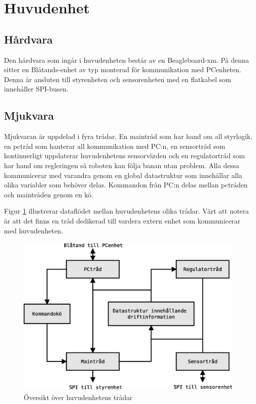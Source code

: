
\section{Huvudenhet}


\subsection{Hårdvara}
Den hårdvara som ingår i huvudenheten består av en Beagleboard-xm. På denna sitter en Blåtands-enhet av typ  monterad för kommunikation med PCenheten. Denna är ansluten till styrenheten och sensorenheten med en flatkabel som innehåller SPI-busen.

\subsection{Mjukvara}
Mjukvaran är uppdelad i fyra trådar. En maintråd som har hand om all styrlogik, en pctråd som hanterar all kommunikation med PC:n, en sensortråd som kontinuerligt uppdaterar huvudenhetens sensorvärden och en regulatortråd som har hand om regleringen så roboten kan följa banan utan problem. Alla dessa kommunicerar med varandra genom en global datastruktur som innehållar alla olika variabler som behöver delas. Kommandon från PC:n delas mellan pctråden och maintråden genom en kö.

Figur \ref{huvud-tradar} illustrerar dataflödet mellan huvudenhetens olika trådar. Värt att notera är att det finns en tråd dedikerad till vardera extern enhet som kommunicerar med huvudenheten.

\begin{figure}[h!]
	\centering
	\includegraphics[scale=0.5]{grafik/huvud-tradar}
	\caption{Översikt över huvudenhetens trådar} \label{huvud-tradar}
\end{figure}

